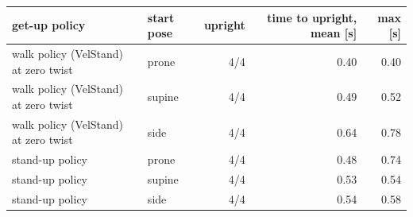 \begin{tabular}{llrrr}\toprule
get-up policy & start pose & upright & time to upright, mean [s] & max [s] \\\midrule
walk policy (VelStand) at zero twist & prone & 4/4 & 0.40 & 0.40 \\
walk policy (VelStand) at zero twist & supine & 4/4 & 0.49 & 0.52 \\
walk policy (VelStand) at zero twist & side & 4/4 & 0.64 & 0.78 \\
stand-up policy & prone & 4/4 & 0.48 & 0.74 \\
stand-up policy & supine & 4/4 & 0.53 & 0.54 \\
stand-up policy & side & 4/4 & 0.54 & 0.58 \\
\bottomrule\end{tabular}
